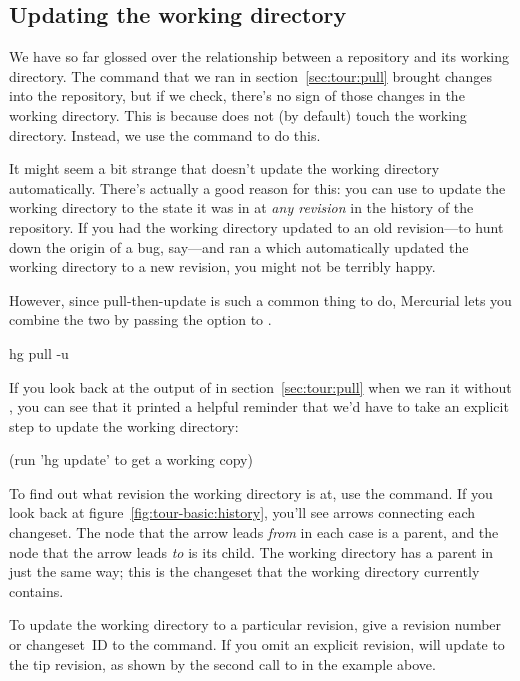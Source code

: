 \subsection{Updating the working directory}

We have so far glossed over the relationship between a repository and
its working directory.  The  command that we ran in
section~\ref{sec:tour:pull} brought changes into the repository, but
if we check, there's no sign of those changes in the working
directory.  This is because  does not (by default) touch
the working directory.  Instead, we use the  command to
do this.

It might seem a bit strange that  doesn't update the
working directory automatically.  There's actually a good reason for
this: you can use  to update the working directory to
the state it was in at \emph{any revision} in the history of the
repository.  If you had the working directory updated to an old
revision---to hunt down the origin of a bug, say---and ran a
 which automatically updated the working directory to a
new revision, you might not be terribly happy.

However, since pull-then-update is such a common thing to do,
Mercurial lets you combine the two by passing the 
option to .
\begin{codesample2}
  hg pull -u
\end{codesample2}
If you look back at the output of  in
section~\ref{sec:tour:pull} when we ran it without ,
you can see that it printed a helpful reminder that we'd have to take
an explicit step to update the working directory:
\begin{codesample2}
  (run 'hg update' to get a working copy)
\end{codesample2}

To find out what revision the working directory is at, use the
 command.
If you look back at figure~\ref{fig:tour-basic:history}, you'll see
arrows connecting each changeset.  The node that the arrow leads
\emph{from} in each case is a parent, and the node that the arrow
leads \emph{to} is its child.  The working directory has a parent in
just the same way; this is the changeset that the working directory
currently contains.

To update the working directory to a particular revision, give a
revision number or changeset~ID to the  command.
If you omit an explicit revision,  will update to the
tip revision, as shown by the second call to  in the
example above.

